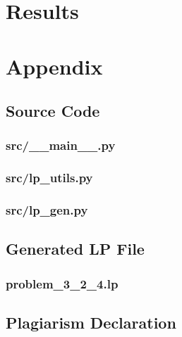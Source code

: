 \documentclass[12pt]{article} %
\begin{document}


\section{Results}


\section{Appendix}


\subsection{Source Code}

\subsubsection{src/\_\_main\_\_.py}


\subsubsection{src/lp\_utils.py}


\subsubsection{src/lp\_gen.py}



\subsection{Generated LP File}

\subsubsection{problem\_3\_2\_4.lp}
% 


\subsection{Plagiarism Declaration}

\end{document}
